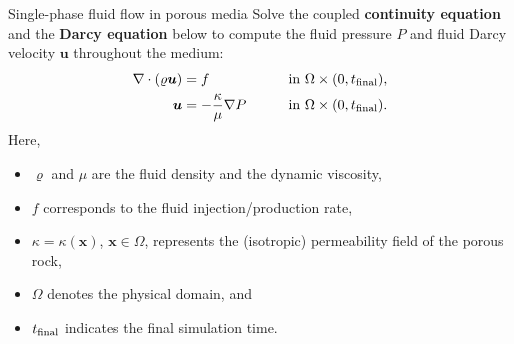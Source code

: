 \begin{frame}{Single-phase fluid flow in porous media}
	Solve the coupled \alert{\textbf{continuity equation}}
	and the  \alert{\textbf{Darcy equation}} below to compute the fluid pressure
	$P$ and fluid Darcy velocity $\boldsymbol{u}$ throughout the medium:
	\begin{alignat}{2}
		\nabla\cdot(\varrho\boldsymbol{u}) & =f & \qquad & \text{in }\Omega\times(0,t_{{\rm final}}),\\
		\boldsymbol{u} & =-\frac{\kappa}{\mu}\nabla P &  & \text{in }\Omega\times(0,t_{{\rm final}}).\label{eq:darcy}
	\end{alignat}
	Here, 
	\begin{itemize}
		\item $\varrho$ and $\mu$ are the fluid density and the dynamic
		viscosity,
		\item $f$ corresponds to the fluid injection\slash production
		rate, 
		\item $\kappa=\kappa(\boldsymbol{x})$, $\boldsymbol{x}\in\Omega$,
		represents the (isotropic) permeability field of the porous rock,
		\item $\Omega$ denotes the physical domain, and 
		\item $t_{{\rm final}}$ indicates the final simulation time.
	\end{itemize}
	
\end{frame}

